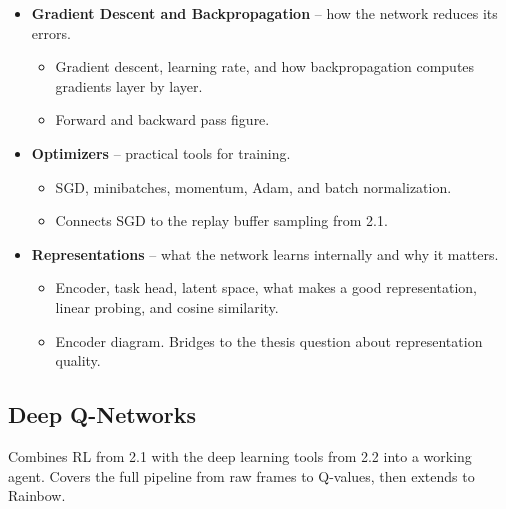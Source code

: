 \documentclass[11pt]{article}
\begin{document}
\begin{itemize}
\begin{itemize}[label=$\circ$, itemsep=0.2em, parsep=0pt, topsep=0pt, partopsep=0pt]
  \end{itemize}
\item \textbf{Gradient Descent and Backpropagation} -- how the
  network reduces its errors.
  \begin{itemize}[label=$\circ$, itemsep=0.2em, parsep=0pt, topsep=0pt, partopsep=0pt]
  \item Gradient descent, learning rate, and how backpropagation
    computes gradients layer by layer.
  \item Forward and backward pass figure.
  \end{itemize}
\item \textbf{Optimizers} -- practical tools for training.
  \begin{itemize}[label=$\circ$, itemsep=0.2em, parsep=0pt, topsep=0pt, partopsep=0pt]
  \item SGD, minibatches, momentum, Adam, and batch normalization.
  \item Connects SGD to the replay buffer sampling from 2.1.
  \end{itemize}
\item \textbf{Representations} -- what the network learns
  internally and why it matters.
  \begin{itemize}[label=$\circ$, itemsep=0.2em, parsep=0pt, topsep=0pt, partopsep=0pt]
  \item Encoder, task head, latent space, what makes a good
    representation, linear probing, and cosine similarity.
  \item Encoder diagram. Bridges to the thesis question about
    representation quality.
  \end{itemize}
\end{itemize}

\subsection{Deep Q-Networks}

\noindent Combines RL from 2.1 with the deep learning tools from 2.2
into a working agent. Covers the full pipeline from raw frames to
Q-values, then extends to Rainbow.
\end{document}
